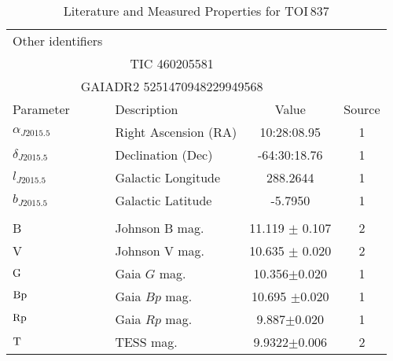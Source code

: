 \begin{table}
\scriptsize
\setlength{\tabcolsep}{2pt}
\centering
\caption{Literature and Measured Properties for TOI$\,$837}
\label{tab:starparams}
\begin{tabular}{llcc}
  \hline
  \hline
Other identifiers\dotfill & \\
\multicolumn{3}{c}{TIC 460205581} \\
\multicolumn{3}{c}{GAIADR2 5251470948229949568} \\
\hline
\hline
Parameter & Description & Value & Source\\
\hline 
$\alpha_{J2015.5}$\dotfill	&Right Ascension (RA)\dotfill & 10:28:08.95 & 1	\\
$\delta_{J2015.5}$\dotfill	&Declination (Dec)\dotfill & -64:30:18.76 & 1	\\
$l_{J2015.5}$\dotfill	&Galactic Longitude\dotfill & 288.2644 & 1	\\
$b_{J2015.5}$\dotfill	&Galactic Latitude\dotfill & -5.7950 & 1	\\
\\
B\dotfill			&Johnson B mag.\dotfill & 11.119 $\pm$ 0.107		& 2	\\
V\dotfill			&Johnson V mag.\dotfill & 10.635 $\pm$ 0.020		& 2	\\
${\rm G}$\dotfill     & Gaia $G$ mag.\dotfill     & 10.356$\pm$0.020 & 1\\
${\rm Bp}$\dotfill     & Gaia $Bp$ mag.\dotfill     & 10.695 $\pm$0.020 & 1\\
${\rm Rp}$\dotfill     & Gaia $Rp$ mag.\dotfill     & 9.887$\pm$0.020 & 1\\
${\rm T}$\dotfill     & TESS mag.\dotfill     & 9.9322$\pm$0.006 & 2\\

\end{tabular}
\end{table}
